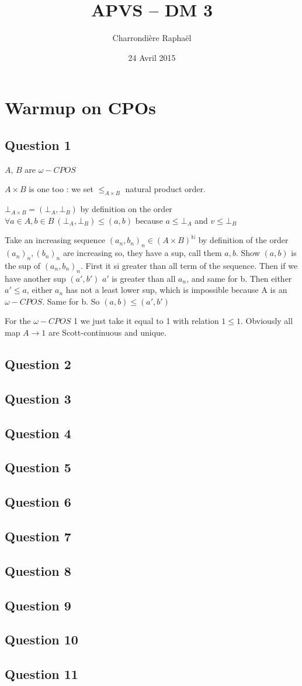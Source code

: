 \documentclass{article}
\title{APVS -- DM 3}
\author{Charrondière Raphaël}
\date{24 Avril 2015}
\begin{document}
\maketitle
\section*{Warmup on CPOs}
\subsection*{Question 1}
$A$, $B$ are $\omega-CPOS$

$A\times B$ is one too : we set $\leq_{A\times B}$ natural product order.

$\bot_{A\times B}=(\bot_A,\bot_B)$ by definition on the order $\forall a\in A,b\in B\ (\bot_A,\bot_B)\leq (a,b)$ because $a\leq\bot_A$ and $v\leq\bot_B$

Take an increasing sequence $(a_n,b_n)_n \in (A\times B)^\mathbb{N}$ by definition of the order $(a_n)_n, (b_n)_n$ are increasing so, they have a sup, call them $a,b$. Show $(a,b)$ is the sup of $(a_n,b_n)_n$. First it si greater than all term of the sequence. Then if we have another sup $(a',b')$ $a'$ is greater than all $a_n$, and same for b. Then either $a'\leq a$, either $a_n$ has not a least lower sup, which is impossible because A is an $\omega-CPOS$. Same for b. So $(a,b)\leq (a',b')$

For the  $\omega-CPOS$ 1 we just take it equal to {1} with relation $1\leq 1$. Obviously all map $A \rightarrow 1$ are Scott-continuous and unique.

\subsection*{Question 2}


\subsection*{Question 3}
\subsection*{Question 4}
\subsection*{Question 5}
\subsection*{Question 6}
\subsection*{Question 7}
\subsection*{Question 8}
\subsection*{Question 9}
\subsection*{Question 10}
\subsection*{Question 11}
\end{document}

